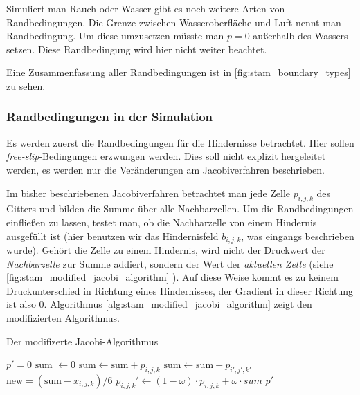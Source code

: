Simuliert man Rauch oder Wasser gibt es noch weitere Arten von Randbedingungen.
Die Grenze zwischen Wasseroberfläche und Luft nennt man -Randbedingung. Um diese umzusetzen müsste man $p=0$ außerhalb
des Wassers setzen. Diese Randbedingung wird hier nicht weiter beachtet.

Eine Zusammenfassung aller Randbedingungen ist in \autoref{fig:stam_boundary_types} zu sehen.

\subsubsection{Randbedingungen in der Simulation}

Es werden zuerst die Randbedingungen für die Hindernisse betrachtet. Hier sollen
\emph{free-slip}-Bedingungen erzwungen werden. Dies soll nicht explizit
hergeleitet werden, es werden nur die Veränderungen am Jacobiverfahren
beschrieben.

Im bisher beschriebenen Jacobiverfahren betrachtet man jede Zelle $p_{i,j,k}$
des Gitters und bilden die Summe über alle Nachbarzellen. Um die Randbedingungen
einfließen zu lassen, testet man, ob die Nachbarzelle von einem Hindernis
ausgefüllt ist (hier benutzen wir das Hindernisfeld $b_{i,j,k}$, was eingangs
beschrieben wurde). Gehört die Zelle zu einem Hindernis, wird nicht der
Druckwert der \emph{Nachbarzelle} zur Summe addiert, sondern der Wert der
\emph{aktuellen Zelle} (siehe \autoref{fig:stam_modified_jacobi_algorithm}
). Auf
diese Weise kommt es zu keinem Druckunterschied in Richtung eines Hindernisses,
der Gradient in dieser Richtung ist also 0.  Algorithmus
\autoref{alg:stam_modified_jacobi_algorithm} zeigt den modifizierten
Algorithmus.

\begin{algorithm}
\caption{Der modifizerte Jacobi-Algorithmus}
\begin{algorithmic}
	\State $p' = 0$
		\State $\textrm{sum } \gets 0$
				\State $\textrm{sum} \gets \textrm{sum} + p_{i,j,k}$
			\Else
				\State $\textrm{sum} \gets \textrm{sum} + p_{i',j',k'}$
			\EndIf
		\EndFor
		\State $\textrm{new} = (\textrm{sum} - x_{i,j,k})/6$
		\State $p_{i,j,k}' \gets (1-\omega) \cdot p_{i,j,k} + \omega \cdot sum$
	\EndFor
	\State \Return $p'$
\EndFunction
\end{algorithmic}
\label{alg:stam_modified_jacobi_algorithm}
\end{algorithm}

